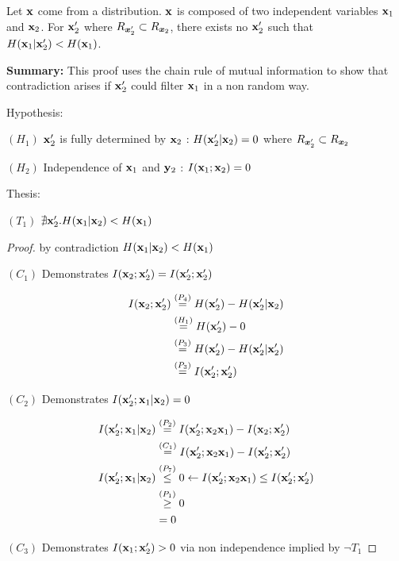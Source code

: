 \begin{lemma}
Let ${\mathbf{x}}$ come from a distribution. ${\mathbf{x}}$ is composed of two independent variables ${\mathbf{x}}_1$ and ${\mathbf{x}}_2$. For ${\mathbf{x}}_2'$ where
$R_{{\bm{x}}_2'} \subset R_{{\bm{x}}_2}$, there exists no ${\mathbf{x}}_2'$ such that $H({\mathbf{x}}_1|{\mathbf{x}}_2') < H({\mathbf{x}}_1)$.

\textbf{Summary:} This proof uses the chain rule of mutual information to show that contradiction arises if ${\mathbf{x}}_2'$ could filter ${\mathbf{x}}_1$ in a non random way.

Hypothesis:

$(H_1)$  ${\mathbf{x}}_2'$ is fully determined by ${\mathbf{x}}_2$ : $H({\mathbf{x}}_2'|{\mathbf{x}}_2) = 0$ where $R_{{\bm{x}}_2'} \subset R_{{\bm{x}}_2}$

$(H_2)$  Independence of ${\mathbf{x}}_1$ and ${\mathbf{y}}_2$ : $I({\mathbf{x}}_1;{\mathbf{x}}_2) = 0$

Thesis:

$(T_1)$ $\nexists {\mathbf{x}}_2'.H({\mathbf{x}}_1|{\mathbf{x}}_2) < H({\mathbf{x}}_1)$

\begin{proof} by contradiction $H({\mathbf{x}}_1|{\mathbf{x}}_2) < H({\mathbf{x}}_1)$

$(C_1)$ Demonstrates $I({\mathbf{x}}_2;{\mathbf{x}}_2') = I({\mathbf{x}}_2';{\mathbf{x}}_2')$

$$
\begin{aligned}
I({\mathbf{x}}_2;{\mathbf{x}}_2') &\stackrel{\left(P_4\right)}{=} H({\mathbf{x}}_2') - H({\mathbf{x}}_2'|{\mathbf{x}}_2) \\
&\stackrel{\left(H_1\right)}{=} H({\mathbf{x}}_2') - 0\\
&\stackrel{\left(P_3\right)}{=} H({\mathbf{x}}_2') - H({\mathbf{x}}_2'|{\mathbf{x}}_2') \\
&\stackrel{\left(P_3\right)}{=} I({\mathbf{x}}_2';{\mathbf{x}}_2')
\end{aligned}
$$

$(C_2)$ Demonstrates  $I({\mathbf{x}}_2';{\mathbf{x}}_1|{\mathbf{x}}_2) = 0$

$$
\begin{aligned}
I({\mathbf{x}}_2';{\mathbf{x}}_1|{\mathbf{x}}_2) &\stackrel{\left(P_2\right)}{=} I({\mathbf{x}}_2'; {\mathbf{x}}_2 {\mathbf{x}}_1) - I({\mathbf{x}}_2; {\mathbf{x}}_2') \\
&\stackrel{\left(C_1\right)}{=} I({\mathbf{x}}_2';{\mathbf{x}}_2 {\mathbf{x}}_1) - I({\mathbf{x}}_2';{\mathbf{x}}_2') \\
I({\mathbf{x}}_2';{\mathbf{x}}_1|{\mathbf{x}}_2)&\stackrel{\left(P_7\right)}{\leq} 0 \leftarrow I({\mathbf{x}}_2';{\mathbf{x}}_2 {\mathbf{x}}_1) \leq  I({\mathbf{x}}_2';{\mathbf{x}}_2') \\
&\stackrel{\left(P_1\right)}{\geq} 0 \\
&=0
\end{aligned}
$$

$(C_3)$ Demonstrates $I({\mathbf{x}}_1;{\mathbf{x}}_2') > 0$ via non independence implied by $\neg T_1$


\end{proof}
\end{lemma}
